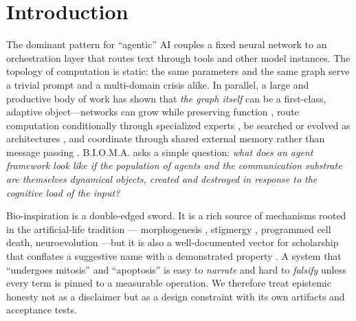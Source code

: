 \documentclass[11pt]{article}
\newcommand{\bioma}{\textsc{B.I.O.M.A.}}
\begin{document}
\section{Introduction}
The dominant pattern for ``agentic'' AI couples a fixed neural network to an
orchestration layer that routes text through tools and other model instances.
The topology of computation is static: the same parameters and the same graph
serve a trivial prompt and a multi-domain crisis alike. In parallel, a large and
productive body of work has shown that \emph{the graph itself} can be a
first-class, adaptive object---networks can grow while preserving function
\cite{chen2016net2net,rusu2016progressive,yoon2018den}, route computation
conditionally through specialized experts \cite{shazeer2017moe,fedus2022switch},
be searched or evolved as architectures
\cite{zoph2017nas,elsken2019nas,real2019amoeba,stanley2002neat}, and coordinate
through shared external memory rather than message passing
\cite{graves2016dnc,hayesroth1985blackboard}. \bioma{} asks a simple question:
\emph{what does an agent framework look like if the population of agents and the
communication substrate are themselves dynamical objects, created and destroyed
in response to the cognitive load of the input?}

Bio-inspiration is a double-edged sword. It is a rich source of mechanisms rooted in the artificial-life tradition
\cite{langton1989alife}---%
morphogenesis \cite{mordvintsev2020growing}, stigmergy \cite{dorigo1996ant},
programmed cell death, neuroevolution
\cite{stanley2019neuroevolution}---but it is also a well-documented vector for
scholarship that conflates a suggestive name with a demonstrated property
\cite{lipton2019troubling}. A system that ``undergoes mitosis'' and
``apoptosis'' is easy to \emph{narrate} and hard to \emph{falsify} unless every
term is pinned to a measurable operation. We therefore treat epistemic honesty
not as a disclaimer but as a design constraint with its own artifacts and
acceptance tests.
\end{document}
